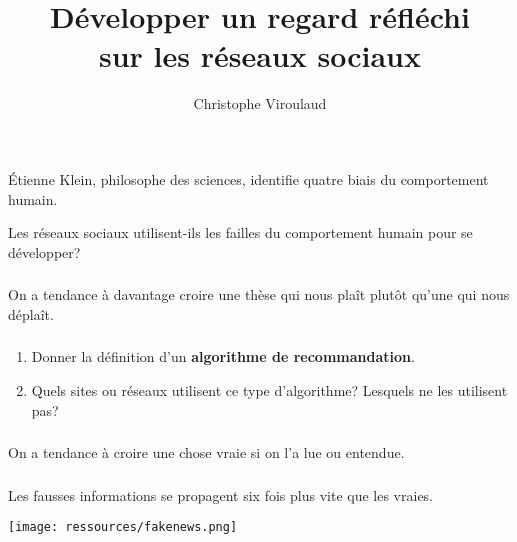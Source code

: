 \documentclass[svgnames,11pt]{beamer}
\author[]{Christophe Viroulaud}
\title{Développer un regard réfléchi\\sur les réseaux sociaux}
\date{\framebox{\textbf{ResSoc 03}}}
\institute{Seconde - SNT}
\begin{document}
\begin{frame}
\titlepage
\end{frame}
\begin{frame}

    Étienne Klein, philosophe des sciences, identifie quatre biais du comportement humain.
    \begin{framed}
        \centering Les réseaux sociaux utilisent-ils les failles du comportement humain pour se développer?
    \end{framed}
\end{frame}
\begin{frame}
    \frametitle{}

    \begin{aretenir}[Biais 1]
    \centering On a tendance à davantage croire une thèse qui nous plaît plutôt qu'une qui nous déplaît.
    \end{aretenir}
\end{frame}
\begin{frame}
    \frametitle{}

    \begin{activite}
    \begin{enumerate}
        \item Donner la définition d'un \textbf{algorithme de recommandation}.
        \item Quels sites ou réseaux utilisent ce type d'algorithme? Lesquels ne les utilisent pas?
    \end{enumerate}
    \end{activite}
\end{frame}
\begin{frame}
    \frametitle{}

    \begin{aretenir}[Biais 2]
    \centering On a tendance à croire une chose vraie si on l'a lue ou entendue.
    \end{aretenir}
\end{frame}
\begin{frame}
    \frametitle{}
\begin{aretenir}[Proposition]
    \centering Les fausses informations se propagent six fois plus vite que les vraies.
\end{aretenir}
    \begin{center}
    \centering
    \texttt{[image: ressources/fakenews.png]}
    \label{IMG}
    \end{center}

\end{frame}
\end{document}

